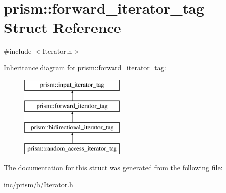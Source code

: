 \hypertarget{structprism_1_1forward__iterator__tag}{}\section{prism\+:\+:forward\+\_\+iterator\+\_\+tag Struct Reference}
\label{structprism_1_1forward__iterator__tag}


{\ttfamily \#include $<$Iterator.\+h$>$}

Inheritance diagram for prism\+:\+:forward\+\_\+iterator\+\_\+tag\+:\begin{figure}[H]
\begin{center}
\leavevmode
\includegraphics[height=4.000000cm]{structprism_1_1forward__iterator__tag}
\end{center}
\end{figure}


The documentation for this struct was generated from the following file\+:\begin{DoxyCompactItemize}
\item 
inc/prism/h/\hyperlink{_iterator_8h}{Iterator.\+h}\end{DoxyCompactItemize}
